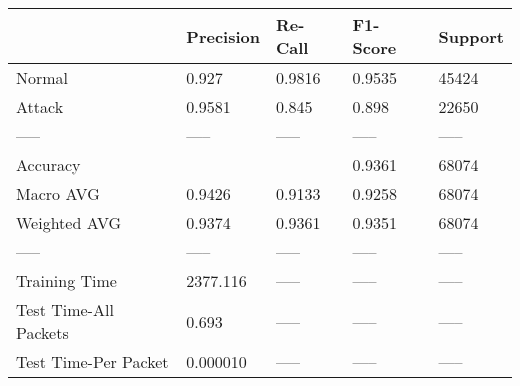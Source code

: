 \begin{tabular}{lllll}
\toprule
{} & Precision & Re-Call & F1-Score & Support \\
\midrule
Normal                &     0.927 &  0.9816 &   0.9535 &   45424 \\
Attack                &    0.9581 &   0.845 &    0.898 &   22650 \\
-----                 &     ----- &   ----- &    ----- &   ----- \\
Accuracy              &           &         &   0.9361 &   68074 \\
Macro AVG             &    0.9426 &  0.9133 &   0.9258 &   68074 \\
Weighted AVG          &    0.9374 &  0.9361 &   0.9351 &   68074 \\
-----                 &     ----- &   ----- &    ----- &   ----- \\
Training Time         &  2377.116 &   ----- &    ----- &   ----- \\
Test Time-All Packets &     0.693 &   ----- &    ----- &   ----- \\
Test Time-Per Packet  &  0.000010 &   ----- &    ----- &   ----- \\
\bottomrule
\end{tabular}
